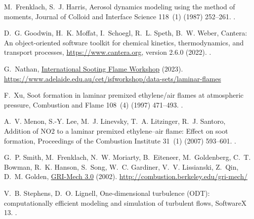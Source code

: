 \documentclass[preprint,letterpaper]{elsarticle}
\begin{document}
\begin{thebibliography}{10}
M.~Frenklach, S.~J. Harris, {Aerosol dynamics modeling using the method of
  moments}, {Journal of Colloid and Interface Science} 118~(1) (1987) 252--261.
\newblock \href {http://dx.doi.org/10.1016/0021-9797(87)90454-1}
  {}.

D.~G. Goodwin, H.~K. Moffat, I.~Schoegl, R.~L. Speth, B.~W. Weber, Cantera: An
  object-oriented software toolkit for chemical kinetics, thermodynamics, and
  transport processes, \url{https://www.cantera.org}, version 2.6.0 (2022).
\newblock \href {http://dx.doi.org/10.5281/zenodo.6387882}
  {}.

G.~Nathan,
  \href{https://www.adelaide.edu.au/cet/isfworkshop/data-sets/laminar-flames}{{International
  Sooting Flame Workshop}} (2023).
\newline\urlprefix\url{https://www.adelaide.edu.au/cet/isfworkshop/data-sets/laminar-flames}

F.~Xu, {Soot formation in laminar premixed ethylene/air flames at atmospheric
  pressure}, {Combustion and Flame} 108~(4) (1997) 471--493.
\newblock \href {http://dx.doi.org/10.1016/S0010-2180(96)00200-3}
  {}.

A.~V. Menon, S.-Y. Lee, M.~J. Linevsky, T.~A. Litzinger, R.~J. Santoro,
  {Addition of NO2 to a laminar premixed ethylene--air flame: Effect on soot
  formation}, {Proceedings of the Combustion Institute} 31~(1) (2007) 593--601.
\newblock \href {http://dx.doi.org/10.1016/j.proci.2006.08.105}
  {}.

G.~P. Smith, M.~Frenklach, N.~W. Moriarty, B.~Eiteneer, M.~Goldenberg, C.~T.
  Bowman, R.~K. Hanson, S.~Song, W.~C. Gardiner, V.~V. Lissianski, Z.~Qin,
  D.~M. Golden, \href{http://combustion.berkeley.edu/gri-mech/}{{GRI-Mech 3.0}}
  (2002).
\newline\urlprefix\url{http://combustion.berkeley.edu/gri-mech/}

V.~B. Stephens, D.~O. Lignell, {One-dimensional turbulence ({ODT}):
  computationally efficient modeling and simulation of turbulent flows},
  {SoftwareX} 13.
\newblock \href {http://dx.doi.org/10.1016/j.softx.2020.100641}
  {}.

\end{thebibliography}
\end{document}

